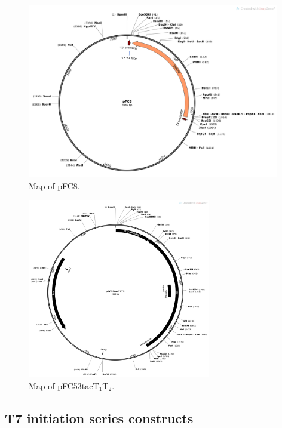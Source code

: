 \documentclass[11pt]{article}
\begin{document}
\begin{figure}[H]
	\includegraphics[width=11cm]{images/plasmid_maps/pFC8_Map.png}
	\centering
	\caption{Map of pFC8.}
	\label{fig:map_pFC8}
\end{figure}


\begin{figure}[H]
	\includegraphics[width=8cm]{images/plasmid_maps/pFC53tacT1T2_Map.png}
	\centering
	\caption{Map of pFC53tacT$_1$T$_2$.}
	\label{fig:map_pFC53tacT1T2}
\end{figure}


\subsection{T7 initiation series constructs}
\label{T7:init} 
\end{document}
